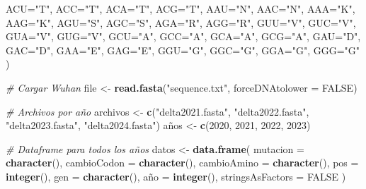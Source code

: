 \documentclass[
]{article}
\newenvironment{Shaded}{\begin{snugshade}}{\end{snugshade}}
\newcommand{\AttributeTok}[1]{\textcolor[rgb]{0.13,0.29,0.53}{#1}}
\newcommand{\CommentTok}[1]{\textcolor[rgb]{0.56,0.35,0.01}{\textit{#1}}}
\newcommand{\ConstantTok}[1]{\textcolor[rgb]{0.56,0.35,0.01}{#1}}
\newcommand{\DecValTok}[1]{\textcolor[rgb]{0.00,0.00,0.81}{#1}}
\newcommand{\FunctionTok}[1]{\textcolor[rgb]{0.13,0.29,0.53}{\textbf{#1}}}
\newcommand{\NormalTok}[1]{#1}
\newcommand{\OtherTok}[1]{\textcolor[rgb]{0.56,0.35,0.01}{#1}}
\newcommand{\StringTok}[1]{\textcolor[rgb]{0.31,0.60,0.02}{#1}}
\begin{document}
\begin{Shaded}
\begin{Highlighting}[]
  \AttributeTok{ACU=}\StringTok{"T"}\NormalTok{, }\AttributeTok{ACC=}\StringTok{"T"}\NormalTok{, }\AttributeTok{ACA=}\StringTok{"T"}\NormalTok{, }\AttributeTok{ACG=}\StringTok{"T"}\NormalTok{,}
  \AttributeTok{AAU=}\StringTok{"N"}\NormalTok{, }\AttributeTok{AAC=}\StringTok{"N"}\NormalTok{, }\AttributeTok{AAA=}\StringTok{"K"}\NormalTok{, }\AttributeTok{AAG=}\StringTok{"K"}\NormalTok{,}
  \AttributeTok{AGU=}\StringTok{"S"}\NormalTok{, }\AttributeTok{AGC=}\StringTok{"S"}\NormalTok{, }\AttributeTok{AGA=}\StringTok{"R"}\NormalTok{, }\AttributeTok{AGG=}\StringTok{"R"}\NormalTok{,}
  \AttributeTok{GUU=}\StringTok{"V"}\NormalTok{, }\AttributeTok{GUC=}\StringTok{"V"}\NormalTok{, }\AttributeTok{GUA=}\StringTok{"V"}\NormalTok{, }\AttributeTok{GUG=}\StringTok{"V"}\NormalTok{,}
  \AttributeTok{GCU=}\StringTok{"A"}\NormalTok{, }\AttributeTok{GCC=}\StringTok{"A"}\NormalTok{, }\AttributeTok{GCA=}\StringTok{"A"}\NormalTok{, }\AttributeTok{GCG=}\StringTok{"A"}\NormalTok{,}
  \AttributeTok{GAU=}\StringTok{"D"}\NormalTok{, }\AttributeTok{GAC=}\StringTok{"D"}\NormalTok{, }\AttributeTok{GAA=}\StringTok{"E"}\NormalTok{, }\AttributeTok{GAG=}\StringTok{"E"}\NormalTok{,}
  \AttributeTok{GGU=}\StringTok{"G"}\NormalTok{, }\AttributeTok{GGC=}\StringTok{"G"}\NormalTok{, }\AttributeTok{GGA=}\StringTok{"G"}\NormalTok{, }\AttributeTok{GGG=}\StringTok{"G"}
\NormalTok{)}

\CommentTok{\# Cargar Wuhan}
\NormalTok{file }\OtherTok{\textless{}{-}} \FunctionTok{read.fasta}\NormalTok{(}\StringTok{"sequence.txt"}\NormalTok{, }\AttributeTok{forceDNAtolower =} \ConstantTok{FALSE}\NormalTok{)}

\CommentTok{\# Archivos por año}
\NormalTok{archivos }\OtherTok{\textless{}{-}} \FunctionTok{c}\NormalTok{(}\StringTok{"delta2021.fasta"}\NormalTok{, }\StringTok{"delta2022.fasta"}\NormalTok{, }\StringTok{"delta2023.fasta"}\NormalTok{, }\StringTok{"delta2024.fasta"}\NormalTok{)}
\NormalTok{años }\OtherTok{\textless{}{-}} \FunctionTok{c}\NormalTok{(}\DecValTok{2020}\NormalTok{, }\DecValTok{2021}\NormalTok{, }\DecValTok{2022}\NormalTok{, }\DecValTok{2023}\NormalTok{)}

\CommentTok{\# Dataframe para todos los años}
\NormalTok{datos }\OtherTok{\textless{}{-}} \FunctionTok{data.frame}\NormalTok{(}
  \AttributeTok{mutacion =} \FunctionTok{character}\NormalTok{(),}
  \AttributeTok{cambioCodon =} \FunctionTok{character}\NormalTok{(),}
  \AttributeTok{cambioAmino =} \FunctionTok{character}\NormalTok{(),}
  \AttributeTok{pos =} \FunctionTok{integer}\NormalTok{(),}
  \AttributeTok{gen =} \FunctionTok{character}\NormalTok{(),}
\NormalTok{  año }\OtherTok{=} \FunctionTok{integer}\NormalTok{(),}
  \AttributeTok{stringsAsFactors =} \ConstantTok{FALSE}
\NormalTok{)}


\end{Highlighting}
\end{Shaded}
\end{document}
